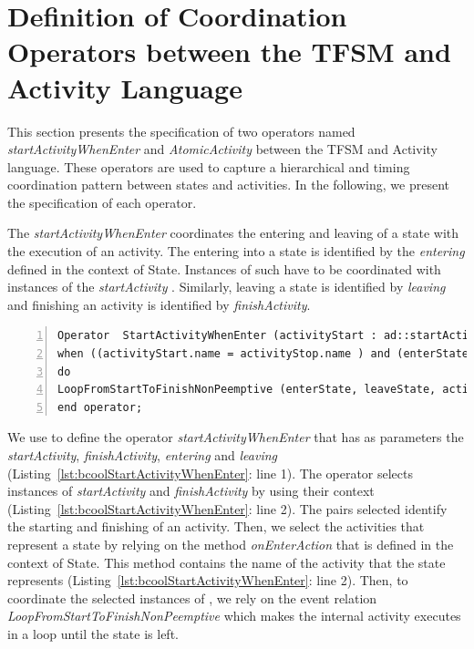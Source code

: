 \section{Definition of Coordination Operators between the TFSM and Activity Language}
This section presents the \bcool specification of two operators named \emph{startActivityWhenEnter} and \emph{AtomicActivity} between the TFSM and Activity language. These operators are used to capture a hierarchical and timing coordination pattern between states and activities. In the following, we present the \bcool specification of each operator.    

The \emph{startActivityWhenEnter} coordinates the entering and leaving of a state with the execution of an activity. The entering into a state is identified by the \textit{entering} \dse defined in the context of State. Instances of such \dse have to be coordinated with instances of the \textit{startActivity} \dse. Similarly, leaving a state is identified by \dse \textit{leaving} and finishing an activity is identified by \dse \textit{finishActivity}. 

\begin{lstlisting}[language=bcool,
caption={Hierarchical operator between TFSM and Activity languages},
label={lst:bcoolStartActivityWhenEnter}, 
basicstyle=\scriptsize\ttfamily, backgroundcolor=\color{LGrey}, numbers=left, xleftmargin=2pt]
Operator  StartActivityWhenEnter (activityStart : ad::startActivity , activityStop : ad::finishActivity, enterState : tfsm::entering, leaveState : tfsm::leaving)
when ((activityStart.name = activityStop.name ) and (enterState.name = leaveState.name) and (activityStart.name = enterState.onEnterAction.name));
do 
LoopFromStartToFinishNonPeemptive (enterState, leaveState, activityStart, activityStop)
end operator;
\end{lstlisting}

We use \bcool to define the operator \emph{startActivityWhenEnter} that has as parameters the \dse \textit{startActivity}, \textit{finishActivity}, \textit{entering} and \textit{leaving} (Listing~\ref{lst:bcoolStartActivityWhenEnter}: line 1). The operator selects instances of \dse \emph{startActivity} and \emph{finishActivity} by using their context (Listing~\ref{lst:bcoolStartActivityWhenEnter}: line 2). The pairs selected identify the starting and finishing of an activity. Then, we select the activities that represent a state by relying on the method \emph{onEnterAction} that is defined in the context of State. This method contains the name of the activity that the state represents (Listing~\ref{lst:bcoolStartActivityWhenEnter}: line 2). Then, to coordinate the selected instances of \dse, we rely on the event relation \emph{LoopFromStartToFinishNonPeemptive} which makes the internal activity executes in a loop until the state is left. 



